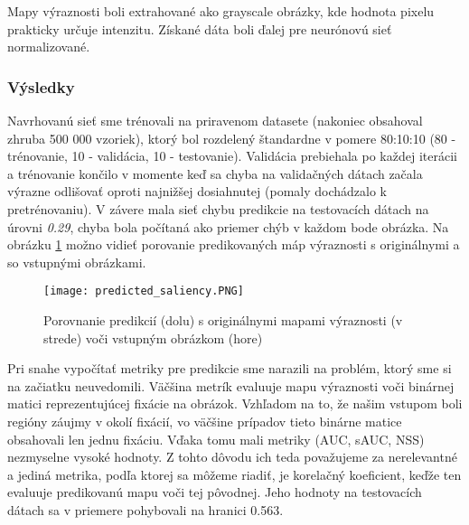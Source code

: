 Mapy výraznosti boli extrahované ako grayscale obrázky, kde hodnota pixelu prakticky určuje intenzitu. Získané dáta boli ďalej pre neurónovú sieť normalizované.
\newline

\subsubsection{Výsledky}

Navrhovanú sieť sme trénovali na priravenom datasete (nakoniec obsahoval zhruba 500 000 vzoriek), ktorý bol rozdelený štandardne v pomere 80:10:10 (80 - trénovanie, 10 - validácia, 10 - testovanie). Validácia prebiehala po každej iterácii a trénovanie končilo v momente keď sa chyba na validačných dátach začala výrazne odlišovať oproti najnižšej dosiahnutej (pomaly dochádzalo k pretrénovaniu). V závere mala sieť chybu predikcie na testovacích dátach na úrovni \textit{0.29}, chyba bola počítaná ako priemer chýb v každom bode obrázka. Na obrázku \ref{results_image} možno vidieť porovanie predikovaných máp výraznosti s originálnymi a so vstupnými obrázkami. 

\begin{figure}[H]
	\begin{center}
		\texttt{[image: predicted\_saliency.PNG]}
		\caption[Porovnanie prvotných výsledkov]{
			Porovnanie predikcií (dolu) s originálnymi mapami výraznosti (v strede) voči vstupným obrázkom (hore)
		}\label{results_image}
	\end{center}
\end{figure}

Pri snahe vypočítať metriky pre predikcie sme narazili na problém, ktorý sme si na začiatku neuvedomili. Väčšina metrík evaluuje mapu výraznosti voči binárnej matici reprezentujúcej fixácie na obrázok. Vzhľadom na to, že našim vstupom boli regióny záujmy v okolí fixácií, vo väčšine prípadov tieto binárne matice obsahovali len jednu fixáciu. Vďaka tomu mali metriky (AUC, sAUC, NSS) nezmyselne vysoké hodnoty. Z tohto dôvodu ich teda považujeme za nerelevantné a jediná metrika, podľa ktorej sa môžeme riadiť, je korelačný koeficient, keďže ten evaluuje predikovanú mapu voči tej pôvodnej. Jeho hodnoty na testovacích dátach sa v priemere pohybovali na hranici 0.563.




